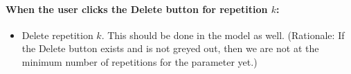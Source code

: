 \documentclass[11pt]{article}
\begin{document}
\paragraph{When the user clicks the Delete button for repetition $k$:}
\begin{itemize}
\item Delete repetition $k$.  This should be done in the model as well.
  (Rationale:  If the Delete button exists and is not greyed out, then
  we are not at the minimum number of repetitions for the parameter yet.)
\end{itemize}
\end{document}
